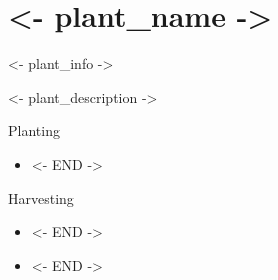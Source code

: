 \chapter{<- plant_name ->}


<- plant_info ->
    
\begin{definition}
<- plant_description ->  
\end{definition}
   
    
\begin{instruction}{Planting}
  \begin{itemize}
    <- FOREACH inst in insts ->
    \item <- inst ->
    <- END ->
  \end{itemize}
\end{instruction}

    
\begin{instruction2}{Harvesting}
  \begin{itemize}
    <- FOREACH hinst in insts ->
    \item <- hinst ->
    <- END ->
  \end{itemize}
\end{instruction2}

\begin{tip}
  \begin{itemize}
    <- FOREACH tip in tips ->
    \item <- tip ->
    <- END ->    
  \end{itemize}
\end{tip}
